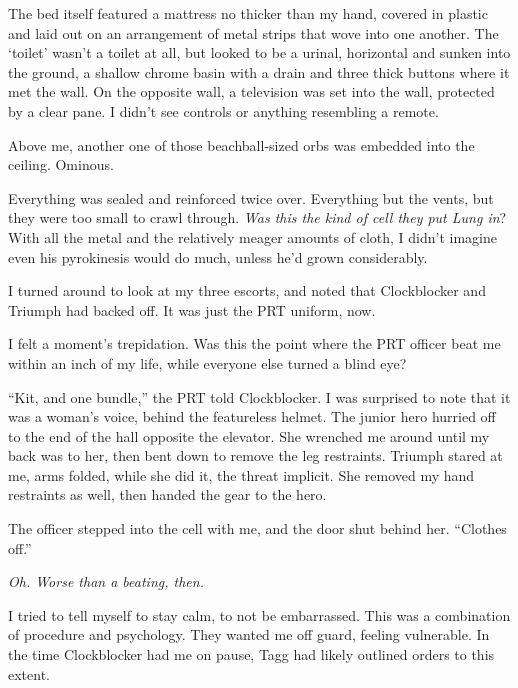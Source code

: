 The bed itself featured a mattress no thicker than my hand, covered in plastic and laid out on an arrangement of metal strips that wove into one another.  The `toilet' wasn't a toilet at all, but looked to be a urinal, horizontal and sunken into the ground, a shallow chrome basin with a drain and three thick buttons where it met the wall.  On the opposite wall, a television was set into the wall, protected by a clear pane.  I didn't see controls or anything resembling a remote.



Above me, another one of those beachball-sized orbs was embedded into the ceiling.  Ominous.



Everything was sealed and reinforced twice over.  Everything but the vents, but they were too small to crawl through.  \emph{Was this the kind of cell they put Lung in}?  With all the metal and the relatively meager amounts of cloth, I didn't imagine even his pyrokinesis would do much, unless he'd grown considerably.



I turned around to look at my three escorts, and noted that Clockblocker and Triumph had backed off.  It was just the PRT uniform, now.



I felt a moment's trepidation.  Was this the point where the PRT officer beat me within an inch of my life, while everyone else turned a blind eye?



``Kit, and one bundle,'' the PRT told Clockblocker.  I was surprised to note that it was a woman's voice, behind the featureless helmet.  The junior hero hurried off to the end of the hall opposite the elevator.  She wrenched me around until my back was to her, then bent down to remove the leg restraints.  Triumph stared at me, arms folded, while she did it, the threat implicit.  She removed my hand restraints as well, then handed the gear to the hero.



The officer stepped into the cell with me, and the door shut behind her.  ``Clothes off.''



\emph{Oh.  Worse than a beating, then.}



I tried to tell myself to stay calm, to not be embarrassed.  This was a combination of procedure and psychology.  They wanted me off guard, feeling vulnerable.  In the time Clockblocker had me on pause, Tagg had likely outlined orders to this extent.



